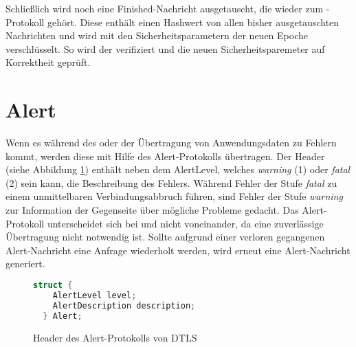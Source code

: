 Schließlich wird noch eine Finished-Nachricht ausgetauscht, die wieder zum -Protokoll gehört. Diese enthält einen Hashwert von allen bisher ausgetauschten
Nachrichten und wird mit den Sicherheitsparametern der neuen Epoche verschlüsselt. So wird der  verifiziert und die neuen Sicherheitsparemeter auf Korrektheit
geprüft.


\section{Alert}

Wenn es während des  oder der Übertragung von Anwendungsdaten zu Fehlern kommt, werden diese mit Hilfe des Alert-Protokolls übertragen.
Der Header (siehe Abbildung \ref{fig:alertlayer}) enthält neben dem AlertLevel, welches \textit{warning} (1) oder \textit{fatal} (2) sein kann,
die Beschreibung des Fehlers. Während Fehler der Stufe \textit{fatal} zu einem unmittelbaren Verbindungsabbruch führen, sind Fehler der Stufe
\textit{warning} zur Information der Gegenseite über mögliche Probleme gedacht. Das Alert-Protokoll unterscheidet sich bei  und 
nicht voneinander, da eine zuverlässige Übertragung nicht notwendig ist. Sollte aufgrund einer verloren gegangenen Alert-Nachricht eine Anfrage
wiederholt werden, wird erneut eine Alert-Nachricht generiert. 

\begin{figure}[ht]
  \centering
  \begin{lstlisting}[language=c]
  struct {
    AlertLevel level;
    AlertDescription description;
  } Alert;
  \end{lstlisting}
  \caption{Header des Alert-Protokolls von DTLS}
  \label{fig:alertlayer}
\end{figure}